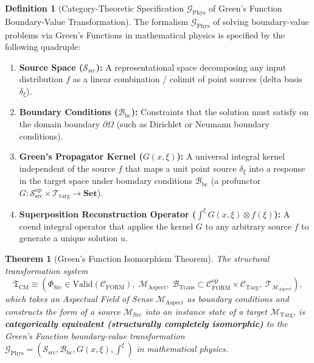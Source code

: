\documentclass[11pt,a4paper]{article}
\theoremstyle{definition}
\newtheorem{definition}{Definition}[section]
\theoremstyle{plain}
\newtheorem{theorem}{Theorem}[section]
\theoremstyle{remark}
\newcommand{\Valid}{\mathrm{Valid}}
\newcommand{\Set}{\mathbf{Set}}
\newcommand{\CFORM}{\mathcal{C}_{\mathrm{FORM}}}
\newcommand{\CTarg}{\mathcal{C}_{\mathrm{Targ}}}
\newcommand{\MSrc}{\mathcal{M}_{\mathrm{Src}}}
\newcommand{\MTarg}{\mathcal{M}_{\mathrm{Targ}}}
\newcommand{\MAspect}{\mathcal{M}_{\mathrm{Aspect}}}
\newcommand{\BTrans}{\mathcal{B}_{\mathrm{Trans}}}
\begin{document}
\begin{definition}[Category-Theoretic Specification $\mathcal{G}_{\mathrm{Phys}}$ of Green's Function Boundary-Value Transformation]\label{def:green-spec}
The formalism $\mathcal{G}_{\mathrm{Phys}}$ of solving boundary-value problems via Green's Functions in mathematical physics is specified by the following quadruple:

\begin{enumerate}
    \item \textbf{Source Space ($\mathcal{S}_{\mathrm{src}}$):} A representational space decomposing any input distribution $f$ as a linear combination / colimit of point sources (delta basis $\delta_\xi$).
    \item \textbf{Boundary Conditions ($\mathcal{B}_{\mathrm{bc}}$):} Constraints that the solution must satisfy on the domain boundary $\partial\Omega$ (such as Dirichlet or Neumann boundary conditions).
    \item \textbf{Green's Propagator Kernel ($G(x, \xi)$):} A universal integral kernel independent of the source $f$ that maps a unit point source $\delta_\xi$ into a response in the target space under boundary conditions $\mathcal{B}_{\mathrm{bc}}$ (a profunctor $G : \mathcal{S}_{\mathrm{src}}^{\mathrm{op}} \times \mathcal{T}_{\mathrm{targ}} \to \Set$).
    \item \textbf{Superposition Reconstruction Operator ($\int^{\xi} G(x, \xi) \otimes f(\xi)$):} A coend integral operator that applies the kernel $G$ to any arbitrary source $f$ to generate a unique solution $u$.
\end{enumerate}
\end{definition}

\begin{theorem}[Green's Function Isomorphism Theorem]\label{thm:green-isomorphism}
The structural transformation system
\begin{equation}
\mathfrak{T}_{\mathrm{CM}} \equiv \left(\Phi_{\mathrm{Src}} \in \Valid(\CFORM),\; \MAspect,\; \BTrans \subset \CFORM^{\mathrm{op}} \times \CTarg,\; \mathcal{T}_{\MAspect}\right),
\end{equation}
which takes an Aspectual Field of Sense $\MAspect$ as boundary conditions and constructs the form of a source $\MSrc$ into an instance state of a target $\MTarg$, is \textbf{categorically equivalent (structurally completely isomorphic)} to the Green's Function boundary-value transformation $\mathcal{G}_{\mathrm{Phys}} = (\mathcal{S}_{\mathrm{src}}, \mathcal{B}_{\mathrm{bc}}, G(x, \xi), \int^\xi)$ in mathematical physics.
\end{theorem}
\end{document}

